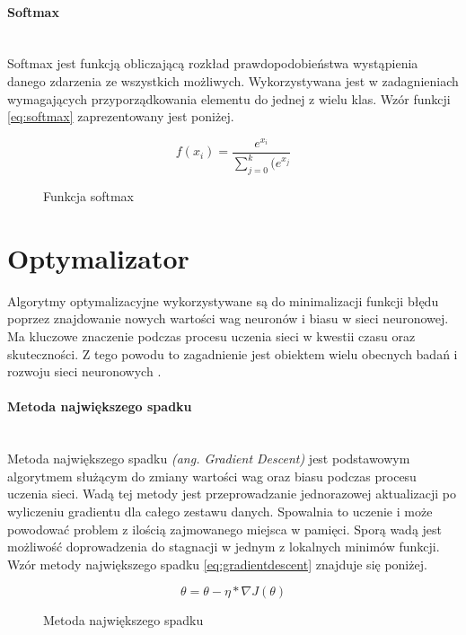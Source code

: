 \paragraph{Softmax} \mbox{}\\
Softmax jest funkcją obliczającą rozkład prawdopodobieństwa wystąpienia danego zdarzenia
ze wszystkich możliwych. Wykorzystywana jest w zadagnieniach wymagających przyporządkowania
elementu do jednej z wielu klas. Wzór funkcji \ref{eq:softmax} zaprezentowany jest poniżej.
\begin{figure}[h!]
\renewcommand{\figurename}{Wzór}%
\begin{equation} \label{eq:softmax}
f(x_{i}) = \frac{e^{x_{i}}} {\sum_{j = 0}^{k}(e^{x_{j}}}
\end{equation}
\caption{Funkcja softmax}
\end{figure}

\section{Optymalizator}

Algorytmy optymalizacyjne wykorzystywane są do minimalizacji funkcji błędu poprzez
znajdowanie nowych wartości wag neuronów i biasu w sieci neuronowej. Ma kluczowe
znaczenie podczas procesu uczenia sieci w kwestii czasu oraz skuteczności.
Z tego powodu to zagadnienie jest obiektem wielu obecnych badań i rozwoju sieci
neuronowych \cite{typesOfOptimizationAlgorithms}.

\paragraph{Metoda największego spadku} \mbox{}\\
Metoda największego spadku \textit{(ang. Gradient Descent)} jest podstawowym algorytmem
służącym do zmiany wartości wag oraz biasu podczas procesu uczenia sieci.
Wadą tej metody jest przeprowadzanie jednorazowej aktualizacji po wyliczeniu gradientu dla
całego zestawu danych. Spowalnia to uczenie i może powodować problem z ilością zajmowanego
miejsca w pamięci. Sporą wadą jest możliwość doprowadzenia do stagnacji w jednym z
lokalnych minimów funkcji. Wzór metody największego spadku \ref{eq:gradientdescent} znajduje się poniżej.
\begin{figure}[h!]
\renewcommand{\figurename}{Wzór}%
\begin{equation} \label{eq:gradientdescent}
\theta = \theta - \eta * \nabla J(\theta)
\end{equation}
\caption{Metoda największego spadku}
\end{figure}

